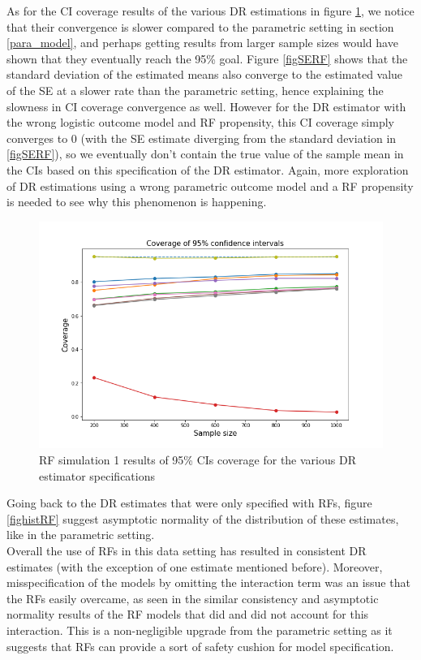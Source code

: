 \documentclass[12pt,twoside]{article}
\begin{document}
As for the CI coverage results of the various DR estimations in figure \ref{figCIRF}, we notice that their convergence is slower compared to the parametric setting in section \ref{para_model}, and perhaps getting results from larger sample sizes would have shown that they eventually reach the 95\% goal. Figure \ref{figSERF} shows that the standard deviation of the estimated means also converge to the estimated value of the SE at a slower rate than the parametric setting, hence explaining the slowness in CI coverage convergence as well. However for the DR estimator with the wrong logistic outcome model and RF propensity, this CI coverage simply converges to 0 (with the SE estimate diverging from the standard deviation in \ref{figSERF}), so we eventually don't contain the true value of the sample mean in the CIs based on this specification of the DR estimator. Again, more exploration of DR estimations using a wrong parametric outcome model and a RF propensity is needed to see why this phenomenon is happening.

\begin{figure}[h!]
    \centering
    \includegraphics[width = 0.9\columnwidth]{figures/CIRF.png}
    \caption{RF simulation 1 results of 95\% CIs coverage for the various DR estimator specifications}
    \label{figCIRF}
\end{figure}

Going back to the DR estimates that were only specified with RFs, figure \ref{fighistRF} suggest asymptotic normality of the distribution of these estimates, like in the parametric setting. \\

Overall the use of RFs in this data setting has resulted in consistent DR estimates (with the exception of one estimate mentioned before). Moreover, misspecification of the models by omitting the interaction term was an issue that the RFs easily overcame, as seen in the similar consistency and asymptotic normality results of the RF models that did and did not account for this interaction. This is a non-negligible upgrade from the parametric setting as it suggests that RFs can provide a sort of safety cushion for model specification.
\end{document}

